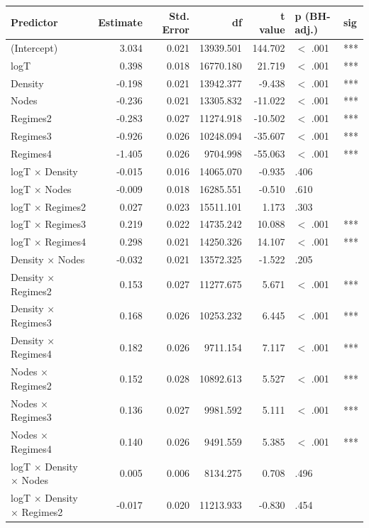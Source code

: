 \begin{table}[ht]
\centering
\begin{tabular}{lrrrrll}
  \hline
Predictor & Estimate & Std. Error & df & t value & p (BH-adj.) & sig \\ 
  \hline
(Intercept) & 3.034 & 0.021 & 13939.501 & 144.702 & $<$ .001 & *** \\ 
  logT & 0.398 & 0.018 & 16770.180 & 21.719 & $<$ .001 & *** \\ 
  Density & -0.198 & 0.021 & 13942.377 & -9.438 & $<$ .001 & *** \\ 
  Nodes & -0.236 & 0.021 & 13305.832 & -11.022 & $<$ .001 & *** \\ 
  Regimes2 & -0.283 & 0.027 & 11274.918 & -10.502 & $<$ .001 & *** \\ 
  Regimes3 & -0.926 & 0.026 & 10248.094 & -35.607 & $<$ .001 & *** \\ 
  Regimes4 & -1.405 & 0.026 & 9704.998 & -55.063 & $<$ .001 & *** \\ 
  logT × Density & -0.015 & 0.016 & 14065.070 & -0.935 & .406 &  \\ 
  logT × Nodes & -0.009 & 0.018 & 16285.551 & -0.510 & .610 &  \\ 
  logT × Regimes2 & 0.027 & 0.023 & 15511.101 & 1.173 & .303 &  \\ 
  logT × Regimes3 & 0.219 & 0.022 & 14735.242 & 10.088 & $<$ .001 & *** \\ 
  logT × Regimes4 & 0.298 & 0.021 & 14250.326 & 14.107 & $<$ .001 & *** \\ 
  Density × Nodes & -0.032 & 0.021 & 13572.325 & -1.522 & .205 &  \\ 
  Density × Regimes2 & 0.153 & 0.027 & 11277.675 & 5.671 & $<$ .001 & *** \\ 
  Density × Regimes3 & 0.168 & 0.026 & 10253.232 & 6.445 & $<$ .001 & *** \\ 
  Density × Regimes4 & 0.182 & 0.026 & 9711.154 & 7.117 & $<$ .001 & *** \\ 
  Nodes × Regimes2 & 0.152 & 0.028 & 10892.613 & 5.527 & $<$ .001 & *** \\ 
  Nodes × Regimes3 & 0.136 & 0.027 & 9981.592 & 5.111 & $<$ .001 & *** \\ 
  Nodes × Regimes4 & 0.140 & 0.026 & 9491.559 & 5.385 & $<$ .001 & *** \\ 
  logT × Density × Nodes & 0.005 & 0.006 & 8134.275 & 0.708 & .496 &  \\ 
  logT × Density × Regimes2 & -0.017 & 0.020 & 11213.933 & -0.830 & .454 &  \\ 

\end{tabular}
\end{table}
